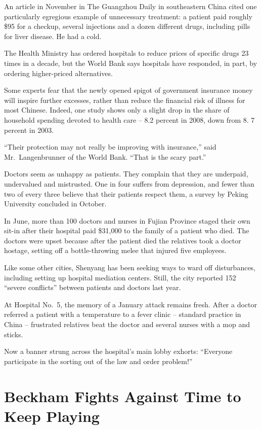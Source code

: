﻿\documentclass[12pt]{article}
\begin{document}
An article in November in The Guangzhou Daily in southeastern China cited one particularly egregious
example of unnecessary treatment: a patient paid roughly \$95 for a checkup, several injections and
a dozen different drugs, including pills for liver disease. He had a cold.

The Health Ministry has ordered hospitals to reduce prices of specific drugs 23 times in a decade,
but the World Bank says hospitals have responded, in part, by ordering higher-priced alternatives.

Some experts fear that the newly opened spigot of government insurance money will inspire further
excesses, rather than reduce the financial risk of illness for most Chinese. Indeed, one study shows
only a slight drop in the share of household spending devoted to health care -- 8.2 percent in 2008,
down from 8. 7 percent in 2003.

``Their protection may not really be improving with insurance,'' said Mr.~Langenbrunner of the World
Bank. ``That is the scary part.''

Doctors seem as unhappy as patients. They complain that they are underpaid, undervalued and
mistrusted. One in four suffers from depression, and fewer than two of every three believe that
their patients respect them, a survey by Peking University concluded in October.

In June, more than 100 doctors and nurses in Fujian Province staged their own sit-in after their
hospital paid \$31,000 to the family of a patient who died. The doctors were upset because after the
patient died the relatives took a doctor hostage, setting off a bottle-throwing melee that injured
five employees.

Like some other cities, Shenyang has been seeking ways to ward off disturbances, including setting
up hospital mediation centers. Still, the city reported 152 ``severe conflicts'' between patients
and doctors last year.

At Hospital No.~5, the memory of a January attack remains fresh. After a doctor referred a patient
with a temperature to a fever clinic -- standard practice in China -- frustrated relatives beat the
doctor and several nurses with a mop and sticks.

Now a banner strung across the hospital's main lobby exhorts: ``Everyone participate in the sorting
out of the law and order problem!''

\section{Beckham Fights Against Time to Keep Playing}
\end{document}
